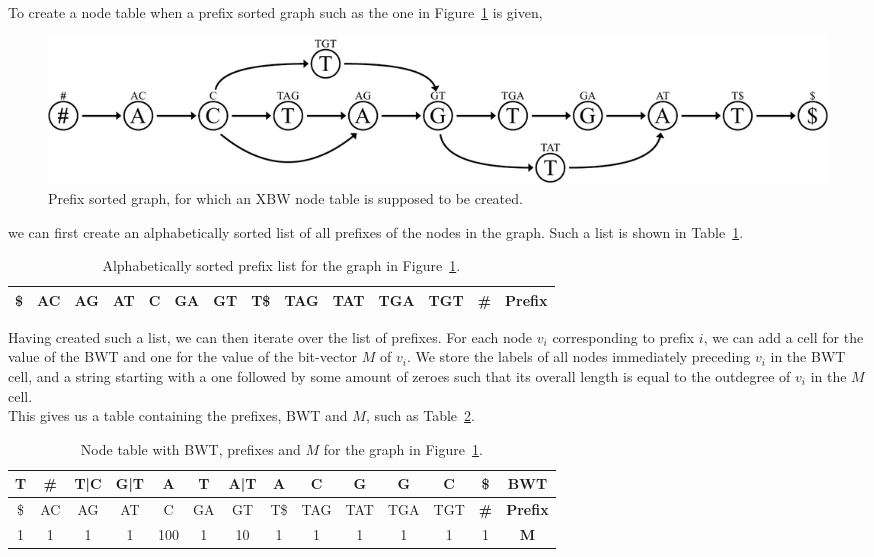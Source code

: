 \documentclass[a4paper,12pt,twoside,BCOR=10mm]{scrbook}
\begin{document}
To create a node table when a prefix sorted graph such as the one in Figure~\ref{fig:evo_fig_node_construct_prefixes} is given,
\begin{figure}[!htb]
\centering
\includegraphics[width=\textwidth]{evo_fig_node_construct_prefixes.pdf}
\caption[Prefix sorted graph]{Prefix sorted graph, for which an XBW node table is supposed to be created.} \label{fig:evo_fig_node_construct_prefixes}
\end{figure}
we can first create
an alphabetically sorted list of all prefixes of the nodes in the graph.
Such a list is shown in Table~\ref{table:node_construct_prefixes_1}.

\begin{table}[htb]
\centering
\caption[Alphabetically sorted prefix list]{Alphabetically sorted prefix list for the graph in Figure~\ref{fig:evo_fig_node_construct_prefixes}.}
\begin{tabular}{ | c | c | c | c | c | c | c | c | c | c | c | c | c | c | }
\hline
\$ & AC & AG & AT & C & GA & GT & T\$ & TAG & TAT & TGA & TGT & \textbf{\#} & \textbf{Prefix} \\ \hline
\end{tabular}
\label{table:node_construct_prefixes_1}
\end{table}

Having created such a list, we can then iterate over the list of prefixes.
For each node $ v_i $ corresponding to prefix $ i $,
we can add a cell for the value of the BWT and one for the value of the bit-vector $ M $ of $ v_i $.
We store the labels of all nodes immediately
preceding $ v_i $ in the BWT cell,
and a string starting with a one followed by some amount of zeroes
such that its overall length is equal to the outdegree of $ v_i $ in the $ M $ cell. \\
This gives us a table containing the prefixes, BWT and $ M $, such as Table~\ref{table:node_construct_prefixes_2}.

\begin{table}[htb]
\centering
\caption[Node table with BWT, prefixes and $ M $]{Node table with BWT, prefixes and $ M $ for the graph in Figure~\ref{fig:evo_fig_node_construct_prefixes}.}
\begin{tabular}{ | c | c | c | c | c | c | c | c | c | c | c | c | c | c | }
\hline
T & \textbf{\#} & T|C & G|T & A & T & A|T & A & C & G & G & C & \$ & \textbf{BWT} \\ \hline
\$ & AC & AG & AT & C & GA & GT & T\$ & TAG & TAT & TGA & TGT & \textbf{\#} & \textbf{Prefix} \\ \hline
1 & 1 & 1 & 1 & 100 & 1 & 10 & 1 & 1 & 1 & 1 & 1 & 1 & $\boldsymbol{M}$ \\ \hline
\end{tabular}
\label{table:node_construct_prefixes_2}
\end{table}
\end{document}
